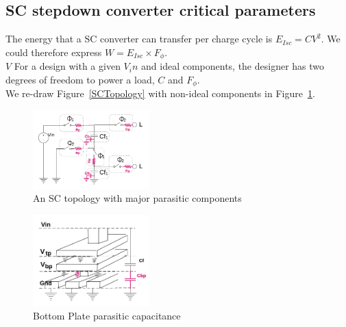 \documentclass[letterpaper,twocolumn,10pt]{article}
\begin{document}
\subsection{SC stepdown converter critical parameters}
The energy that a SC converter can transfer per charge cycle is $E_{Isc} = CV^2$. We could therefore express $W = E_{Isc}\times F_\phi$.\\
$V$ For a design with a given $V_in$ and ideal components, the designer has two degrees of freedom to power a load, $C$ and $F_\phi$.\\  
We re-draw Figure~\ref{SCTopology} with non-ideal components in Figure~\ref{NonIdealSCTopology}.\\
\begin{figure}[here]
\includegraphics[width=0.4\textwidth]{SCTopologyParasitics}
\caption{An SC topology with major parasitic components}
\label{NonIdealSCTopology}
\end{figure}
\begin{figure}[here]
\includegraphics[width=0.4\textwidth]{BottomPlateCap}
\caption{Bottom Plate parasitic capacitance}
\label{BottomPlatePar}
\end{figure}
\end{document}
